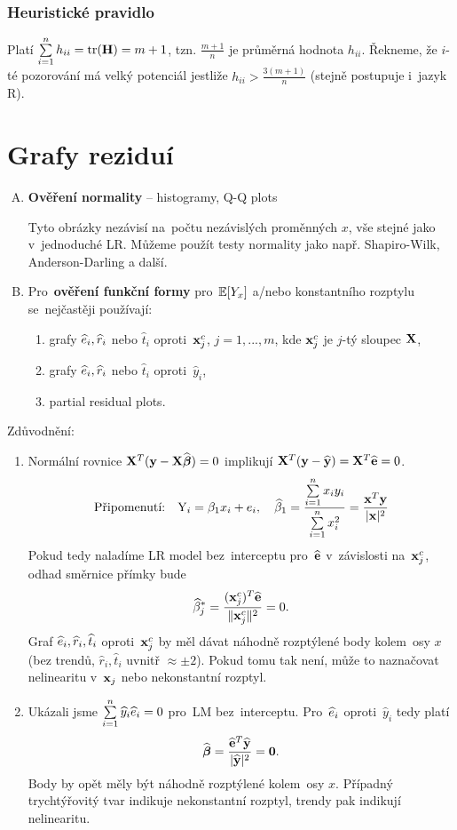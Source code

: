 \subsubsection{Heuristické pravidlo}
Platí $\sum\limits_{i=1}^{n} h_{ii} = \text{tr}(\textbf{H}) = m + 1$, tzn. $\frac{m+1}{n}$ je průměrná hodnota $h_{ii}$. Řekneme, že $i$-té pozorování má velký potenciál jestliže $h_{ii} > \frac{3(m+1)}{n}$ (stejně postupuje i~jazyk R).

\section{Grafy reziduí}
\begin{enumerate}[A)]
\item \textbf{Ověření normality} -- histogramy, Q-Q plots

Tyto obrázky nezávisí na~počtu nezávislých proměnných $x$, vše stejné jako v~jednoduché LR. Můžeme použít testy normality jako např. Shapiro-Wilk, Anderson-Darling a další.
\item Pro~\textbf{ověření funkční formy} pro~$\mathbb{E} [Y_x]$ a/nebo konstantního rozptylu se~nejčastěji používají:
\begin{enumerate}[1)]
\item grafy $\widehat{e}_i, \widehat{r}_i$ nebo $\widehat{t}_i$ oproti~$\mathbf{x}_j^c$, $j = 1,..., m$, kde $\mathbf{x}_j^c$ je $j$-tý sloupec $\mathbf{X}$,
\item grafy $\widehat{e}_i, \widehat{r}_i$ nebo $\widehat{t}_i$ oproti~$\widehat{y}_i$,
\item partial residual plots.
\end{enumerate}
\end{enumerate}

\begin{remark}
Zdůvodnění:
\begin{enumerate}
\item Normální rovnice $\mathbf{X}^T (\mathbf{y} - \mathbf{X} \widehat{\boldsymbol{\beta}}) = 0$ implikují $\mathbf{X}^T (\mathbf{y} - \widehat{\mathbf{y}}) = \mathbf{X}^T \widehat{\mathbf{e}} = 0$.
 $$
 \text{Připomenutí:} \quad \text{Y}_i = \beta_1 x_i + e_i, \quad \widehat{\beta}_1 = \frac{\sum\limits_{i=1}^{n} x_i y_i}{\sum\limits_{i=1}^{n} x_i^2} = \frac{\mathbf{x}^T\mathbf{y}}{| \mathbf{x} |^2 }
 $$
Pokud tedy naladíme LR model bez~interceptu pro~$\widehat{\mathbf{e}}$ v~závislosti na~$\mathbf{x}_j^c$, odhad směrnice přímky bude
 $$
  \widehat{\beta}_j^* = \frac{(\mathbf{x}_j^c)^T \widehat{\mathbf{e}}}{\| \mathbf{x}_j^c \|^2} = 0.
 $$
Graf $\widehat{e}_i, \widehat{r}_i, \widehat{t}_i$ oproti~$\mathbf{x}_j^c$ by měl dávat náhodně rozptýlené body kolem~osy $x$ (bez trendů, $\widehat{r}_i, \widehat{t}_i$ uvnitř $\approx \pm 2$).
Pokud tomu tak není, může to naznačovat nelinearitu v~$\mathbf{x}_j$ nebo nekonstantní rozptyl.
\item Ukázali jsme $\sum\limits_{i=1}^{n} \widehat{y}_i \widehat{e}_i = 0$ pro~LM bez~interceptu. Pro~$\widehat{e}_i$ oproti~$\widehat{y}_i$ tedy platí
 $$
  \widehat{\boldsymbol{\beta}} = \frac{\widehat{\mathbf{e}}^T \widehat{\mathbf{y}}}{| \widehat{\mathbf{y}} |^2} = \boldsymbol{0}.
 $$
Body by opět měly být náhodně rozptýlené kolem~osy $x$. Případný trychtýřovitý tvar indikuje nekonstantní rozptyl, trendy pak indikují nelinearitu.
\end{enumerate}	
\end{remark}

